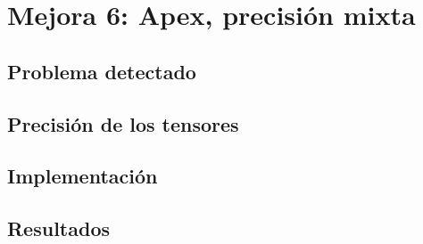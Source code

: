 \chapter{Mejora 6: Apex, precisión mixta}\label{apex}

\section{Problema detectado}\label{sec:apex_problem}

\section{Precisión de los tensores}\label{sec:apex_precision}

\section{Implementación}\label{sec:apex_implementation}

\section{Resultados}\label{sec:apex_resultados}
